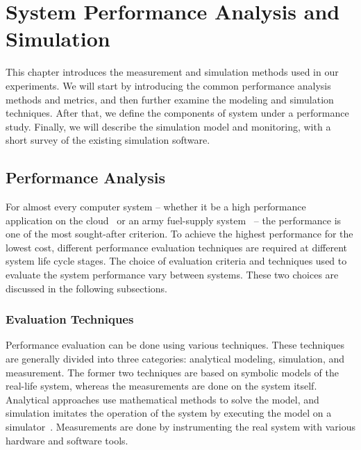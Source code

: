 \chapter{System Performance Analysis and Simulation}
\label{chapter:system-performance-analysis-and-simulation}


This chapter introduces the measurement and simulation methods used in our experiments. We will start by introducing the common performance analysis methods and metrics, and then further examine the modeling and simulation techniques. After that, we define the components of system under a performance study. Finally, we will describe the simulation model and monitoring, with a short survey of the existing simulation software.

\section{Performance Analysis}
For almost every computer system -- whether it be a high performance application on the cloud~\cite{jackson:2010:HPCOC} or an army fuel-supply system~\cite{sabuncuoglu:2005:TAS} -- the performance is one of the most sought-after criterion. To achieve the highest performance for the lowest cost, different performance evaluation techniques are required at different system life cycle stages. The choice of evaluation criteria and techniques used to evaluate the system performance vary between systems. These two choices are discussed in the following subsections.~\cite{jain:1991:AOCSPA}

\subsection{Evaluation Techniques}
Performance evaluation can be done using various techniques. These techniques are generally divided into three categories: analytical modeling, simulation, and measurement. The former two techniques are based on symbolic models of the real-life system, whereas the measurements are done on the system itself. Analytical approaches use mathematical methods to solve the model, and simulation imitates the operation of the system by executing the model on a simulator~\cite{Banks:2010:DES}. Measurements are done by instrumenting the real system with various hardware and software tools.~\cite{jain:1991:AOCSPA}

